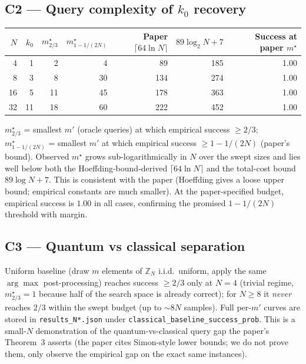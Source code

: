 \documentclass[11pt]{article}
\begin{document}
\subsection{C2 --- Query complexity of $k_0$ recovery}
\begin{center}
\begin{tabular}{@{}rrrrrrr@{}}
\toprule
$N$ & $k_0$ & $m^{\star}_{2/3}$ & $m^{\star}_{1-1/(2N)}$ & Paper $\lceil 64 \ln N\rceil$ & $89\log_2 N + 7$ & Success at paper $m^{\star}$ \\
\midrule
4  & 1  & 2  & 4  & 89  & 185 & 1.00 \\
8  & 3  & 8  & 30 & 134 & 274 & 1.00 \\
16 & 5  & 11 & 45 & 178 & 363 & 1.00 \\
32 & 11 & 18 & 60 & 222 & 452 & 1.00 \\
\bottomrule
\end{tabular}
\end{center}
$m^{\star}_{2/3}$ = smallest $m'$ (oracle queries) at which empirical
success $\geq 2/3$; $m^{\star}_{1-1/(2N)}$ = smallest $m'$ at which empirical
success $\geq 1 - 1/(2N)$ (paper's bound). Observed $m^{\star}$ grows
sub-logarithmically in $N$ over the swept sizes and lies well below both the
Hoeffding-bound-derived $\lceil 64\ln N\rceil$ and the total-cost bound
$89\log N + 7$. This is consistent with the paper (Hoeffding gives a loose
upper bound; empirical constants are much smaller). At the paper-specified
budget, empirical success is $1.00$ in all cases, confirming the promised
$1-1/(2N)$ threshold with margin.

\subsection{C3 --- Quantum vs classical separation}
Uniform baseline (draw $m$ elements of $\mathbb{Z}_N$ i.i.d.\ uniform, apply
the same $\arg\max$ post-processing) reaches success $\geq 2/3$ only at $N=4$
(trivial regime, $m^{\star}_{2/3}=1$ because half of the search space is
already correct); for $N \geq 8$ it \emph{never} reaches $2/3$ within the swept
budget (up to $\sim 8N$ samples). Full per-$m'$ curves are stored in
\texttt{results\_N*.json} under \texttt{classical\_baseline\_success\_prob}.
This is a small-$N$ demonstration of the quantum-vs-classical query gap the
paper's Theorem~3 asserts (the paper cites Simon-style lower bounds; we do
not prove them, only observe the empirical gap on the exact same instances).
\end{document}
